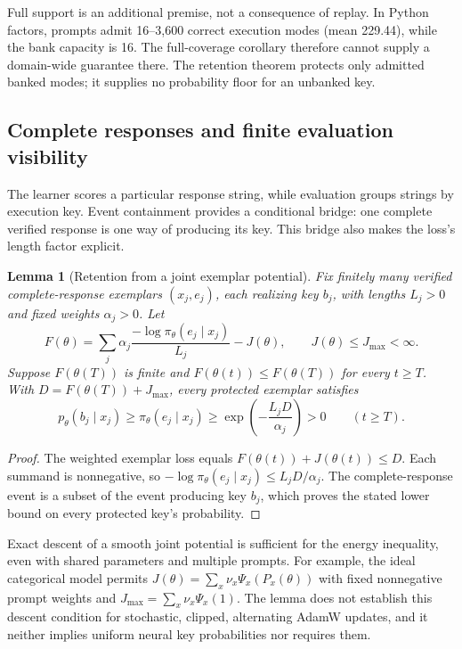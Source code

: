 \documentclass{article}
\newcommand{\1}{\mathbf 1}
\newtheorem{lemma}{Lemma}[section]
\theoremstyle{remark}
\theoremstyle{definition}
\theoremstyle{plain}
\begin{document}
Full support is an additional premise, not a consequence of replay. In
Python factors, prompts admit 16--3,600 correct execution modes (mean 229.44),
while the bank capacity is 16. The full-coverage corollary therefore cannot
supply a domain-wide guarantee there. The retention theorem protects only
admitted banked modes; it supplies no probability floor for an unbanked key.

\subsection{Complete responses and finite evaluation visibility}
\label{app:theory-exemplar-bridge}

The learner scores a particular response string, while evaluation groups
strings by execution key. Event containment provides a conditional bridge:
one complete verified response is one way of producing its key. This bridge
also makes the loss's length factor explicit.

\begin{lemma}[Retention from a joint exemplar potential]
\label{lem:shared-exemplar-retention}
Fix finitely many verified complete-response exemplars $(x_j,e_j)$, each
realizing key $b_j$, with lengths $L_j>0$ and fixed weights $\alpha_j>0$.
Let
\[
 F(\theta)=\sum_j\alpha_j
 \frac{-\log\pi_\theta(e_j\mid x_j)}{L_j}-J(\theta),
 \qquad J(\theta)\le J_{\max}<\infty.
\]
Suppose $F(\theta(T))$ is finite and
$F(\theta(t))\le F(\theta(T))$ for every $t\ge T$. With
$D=F(\theta(T))+J_{\max}$, every protected exemplar satisfies
\[
 p_\theta(b_j\mid x_j)\ge\pi_\theta(e_j\mid x_j)
 \ge\exp\!\left(-\frac{L_jD}{\alpha_j}\right)>0
 \qquad(t\ge T).
\]
\end{lemma}
\begin{proof}
The weighted exemplar loss equals $F(\theta(t))+J(\theta(t))\le D$.
Each summand is nonnegative, so
$-\log\pi_\theta(e_j\mid x_j)\le L_jD/\alpha_j$.
The complete-response event is a subset of the event producing key $b_j$,
which proves the stated lower bound on every protected key's probability.
\end{proof}

Exact descent of a smooth joint potential is sufficient for the energy
inequality, even with shared parameters and multiple prompts. For example,
the ideal categorical model permits
$J(\theta)=\sum_x\nu_x\Psi_x(P_x(\theta))$ with fixed nonnegative prompt
weights and $J_{\max}=\sum_x\nu_x\Psi_x(1)$. The lemma does not establish
this descent condition for stochastic, clipped, alternating AdamW updates,
and it neither implies uniform neural key probabilities nor requires them.
\end{document}
